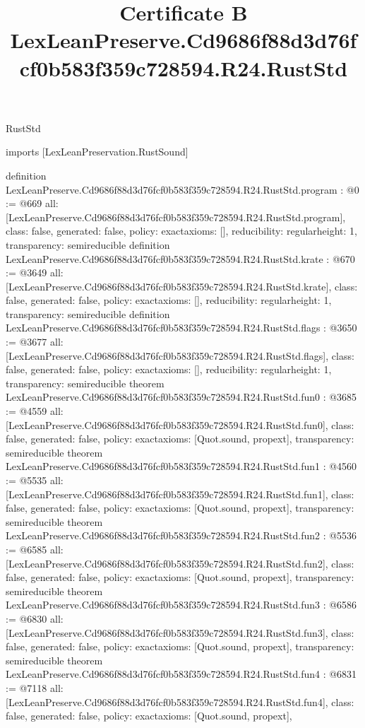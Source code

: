 \begin{lexlean}{RustStd}
\title{Certificate B LexLeanPreserve.Cd9686f88d3d76fcf0b583f359c728594.R24.RustStd}
\begin{coremodule}
imports [LexLeanPreservation.RustSound]

definition LexLeanPreserve.Cd9686f88d3d76fcf0b583f359c728594.R24.RustStd.program : @0 := @669 {
  all: [LexLeanPreserve.Cd9686f88d3d76fcf0b583f359c728594.R24.RustStd.program],
  class: false,
  generated: false,
  policy: exact{axioms: []},
  reducibility: regular{height: 1},
  transparency: semireducible
}
definition LexLeanPreserve.Cd9686f88d3d76fcf0b583f359c728594.R24.RustStd.krate : @670 := @3649 {
  all: [LexLeanPreserve.Cd9686f88d3d76fcf0b583f359c728594.R24.RustStd.krate],
  class: false,
  generated: false,
  policy: exact{axioms: []},
  reducibility: regular{height: 1},
  transparency: semireducible
}
definition LexLeanPreserve.Cd9686f88d3d76fcf0b583f359c728594.R24.RustStd.flags : @3650 := @3677 {
  all: [LexLeanPreserve.Cd9686f88d3d76fcf0b583f359c728594.R24.RustStd.flags],
  class: false,
  generated: false,
  policy: exact{axioms: []},
  reducibility: regular{height: 1},
  transparency: semireducible
}
theorem LexLeanPreserve.Cd9686f88d3d76fcf0b583f359c728594.R24.RustStd.fun0 : @3685 := @4559 {
  all: [LexLeanPreserve.Cd9686f88d3d76fcf0b583f359c728594.R24.RustStd.fun0],
  class: false,
  generated: false,
  policy: exact{axioms: [Quot.sound, propext]},
  transparency: semireducible
}
theorem LexLeanPreserve.Cd9686f88d3d76fcf0b583f359c728594.R24.RustStd.fun1 : @4560 := @5535 {
  all: [LexLeanPreserve.Cd9686f88d3d76fcf0b583f359c728594.R24.RustStd.fun1],
  class: false,
  generated: false,
  policy: exact{axioms: [Quot.sound, propext]},
  transparency: semireducible
}
theorem LexLeanPreserve.Cd9686f88d3d76fcf0b583f359c728594.R24.RustStd.fun2 : @5536 := @6585 {
  all: [LexLeanPreserve.Cd9686f88d3d76fcf0b583f359c728594.R24.RustStd.fun2],
  class: false,
  generated: false,
  policy: exact{axioms: [Quot.sound, propext]},
  transparency: semireducible
}
theorem LexLeanPreserve.Cd9686f88d3d76fcf0b583f359c728594.R24.RustStd.fun3 : @6586 := @6830 {
  all: [LexLeanPreserve.Cd9686f88d3d76fcf0b583f359c728594.R24.RustStd.fun3],
  class: false,
  generated: false,
  policy: exact{axioms: [Quot.sound, propext]},
  transparency: semireducible
}
theorem LexLeanPreserve.Cd9686f88d3d76fcf0b583f359c728594.R24.RustStd.fun4 : @6831 := @7118 {
  all: [LexLeanPreserve.Cd9686f88d3d76fcf0b583f359c728594.R24.RustStd.fun4],
  class: false,
  generated: false,
  policy: exact{axioms: [Quot.sound, propext]},
}
\end{coremodule}
\end{lexlean}
